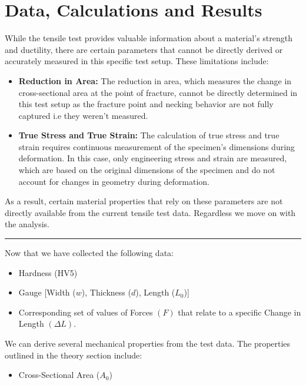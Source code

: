 \documentclass{article}
\begin{document}
{        
    \newpage\vspace*{-20pt}
    
    \section{Data, Calculations and Results}
    
    While the tensile test provides valuable information about a material's strength and ductility, there are certain parameters that cannot be directly derived or accurately measured in this specific test setup. These limitations include:
    \begin{itemize}[left=0pt, itemsep=-1mm]
        \item \textbf{Reduction in Area:} The reduction in area, which measures the change in cross-sectional area at the point of fracture, cannot be directly determined in this test setup as the fracture point and necking behavior are not fully captured i.e they weren't measured.
        \item \textbf{True Stress and True Strain:} The calculation of true stress and true strain requires continuous measurement of the specimen's dimensions during deformation. In this case, only engineering stress and strain are measured, which are based on the original dimensions of the specimen and do not account for changes in geometry during deformation.
    \end{itemize}
    As a result, certain material properties that rely on these parameters are not directly available from the current tensile test data. Regardless we move on with the analysis.\\
    \vspace{1em}
    \hrule
    \vspace{1em}
    Now that we have collected the following data:
    \begin{itemize}
        \item Hardness (HV5)
        \item Gauge [Width (\(w\)), Thickness (\(d\)), Length (\(L_0\))]
        \item Corresponding set of values of Forces \((F)\) that relate to a specific Change in Length \((\Delta L)\).
    \end{itemize}
    We can derive several mechanical properties from the test data. The properties outlined in the theory section include:
    \begin{itemize}
        \item Cross-Sectional Area ($A_0$)

\end{itemize}}
\end{document}
